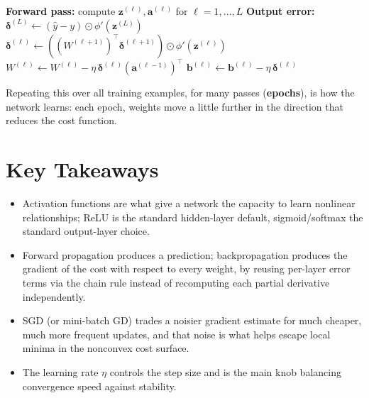 \documentclass[11pt]{article}
\begin{document}
\begin{algorithm}[h]
\caption{Training one example with backpropagation + SGD}
\begin{algorithmic}[1]
\State \textbf{Forward pass:} compute $\mathbf{z}^{(\ell)}, \mathbf{a}^{(\ell)}$ for $\ell = 1, \dots, L$
\State \textbf{Output error:} $\boldsymbol{\delta}^{(L)} \gets (\hat{y} - y) \odot \phi'(\mathbf{z}^{(L)})$
  \State $\boldsymbol{\delta}^{(\ell)} \gets \left((W^{(\ell+1)})^\top \boldsymbol{\delta}^{(\ell+1)}\right) \odot \phi'(\mathbf{z}^{(\ell)})$
\EndFor
{}
  \State $W^{(\ell)} \gets W^{(\ell)} - \eta\, \boldsymbol{\delta}^{(\ell)} (\mathbf{a}^{(\ell-1)})^\top$
  \State $\mathbf{b}^{(\ell)} \gets \mathbf{b}^{(\ell)} - \eta\, \boldsymbol{\delta}^{(\ell)}$
\EndFor
\end{algorithmic}
\end{algorithm}

Repeating this over all training examples, for many passes (\textbf{epochs}),
is how the network learns: each epoch, weights move a little further in
the direction that reduces the cost function.

\section{Key Takeaways}

\begin{itemize}
  \item Activation functions are what give a network the capacity to
        learn nonlinear relationships; ReLU is the standard hidden-layer
        default, sigmoid/softmax the standard output-layer choice.
  \item Forward propagation produces a prediction; backpropagation
        produces the gradient of the cost with respect to every weight,
        by reusing per-layer error terms via the chain rule instead of
        recomputing each partial derivative independently.
  \item SGD (or mini-batch GD) trades a noisier gradient estimate for
        much cheaper, much more frequent updates, and that noise is what
        helps escape local minima in the nonconvex cost surface.
  \item The learning rate $\eta$ controls the step size and is the main
        knob balancing convergence speed against stability.
\end{itemize}
\end{document}
